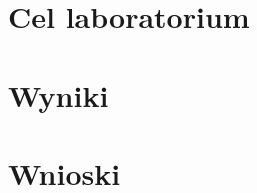 \documentclass{article}
\begin{document}

\newpage
\section{Cel laboratorium}

\section{Wyniki}


\section{Wnioski}
\end{document}
